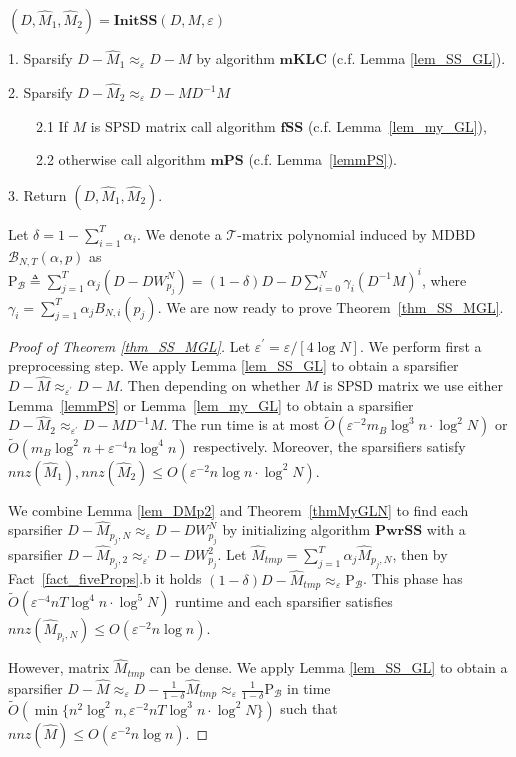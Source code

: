 \documentclass[11pt]{article}
\newcommand{\SPSD}{\mathrm{SPSD}}
\newcommand{\MDBD}{\mathrm{MDBD}}
\newcommand{\GL}{\mathcal{T}}
\newcommand{\BNTap}{\mathcal{B}_{N,T}(\alpha,p)}
\newcommand{\GLB}{\mathrm{P}_{\mathcal{B}}}
\newcommand{\mKLC}{\mathrm{\mathbf{mKLC}}}
\newcommand{\mPS}{\mathrm{\mathbf{mPS}}}
\newcommand{\fSS}{\mathrm{\mathbf{fSS}}}
\newcommand{\InitSS}{\mathrm{\mathbf{InitSS}}}
\newcommand{\PwrSS}{\mathrm{\mathbf{PwrSS}}}
\newcommand{\wO}{\widetilde{O}}
\newcommand{\hM}{\widehat{M}}
\newcommand{\Di}{D^{-1}}
\newcommand{\prm}{\prime}
\newcommand{\eps}{\epsilon}
\renewcommand{\leq}{\leqslant}
\renewcommand{\eps}{\varepsilon}
\numberwithin{thm}{section}
\begin{document}
\begin{algorithm}[H]
\caption{}
\label{alg_Preprocess}

$(D,\hM_{1},\hM_{2})=\InitSS(D,M,\eps)$

1. Sparsify $D-\hM_{1} \approx_{\eps}D-M$ by algorithm $\mKLC$ (c.f. Lemma \ref{lem_SS_GL}).

2. Sparsify $D-\hM_{2} \approx_{\eps}D-M\Di M$

$\qquad$2.1 If $M$ is $\SPSD$ matrix call algorithm $\fSS$ (c.f. Lemma~\ref{lem_my_GL}),

$\qquad$2.2 otherwise call algorithm $\mPS$ (c.f. Lemma~\ref{lemmPS}).

3. Return $(D,\hM_{1},\hM_{2})$.
\end{algorithm}

Let $\delta=1-\sum_{i=1}^{T}\alpha_i$. We denote a $\GL$-matrix polynomial induced by $\MDBD$ $\BNTap$ as
$\GLB \triangleq\sum_{j=1}^{T}\alpha_{j}(D-DW_{p_j}^{N}) =
(1-\delta)D-D\sum_{i=0}^{N}\gamma_{i}(\Di M)^{i}$,
where $\gamma_{i}=\sum_{j=1}^{T}\alpha_{j}B_{N,i}(p_j)$. We are now ready to prove Theorem~\ref{thm_SS_MGL}.

\begin{proof}[Proof of Theorem \ref{thm_SS_MGL}] Let $\eps^{\prm}=\eps/[4\log N]$.
We perform first a preprocessing step. We apply Lemma \ref{lem_SS_GL}
to obtain a sparsifier $D-\hM \approx_{\eps^{\prm}}D-M$.
Then depending on whether $M$ is $\SPSD$ matrix
we use either Lemma~\ref{lemmPS} or Lemma~\ref{lem_my_GL}
to obtain a sparsifier $D-\hM_{2}\approx_{\eps^{\prm}}D-M\Di M$.
The run time is at most $\wO(\eps^{-2}m_{B}\log^{3}n\cdot\log^{2}N)$ or $\wO(m_{B}\log^{2}n+\eps^{-4}n\log^{4}n)$ respectively. Moreover, the sparsifiers satisfy $nnz(\hM_{1}),nnz(\hM_{2})\leq O(\eps^{-2}n\log n\cdot\log^{2}N)$.

We combine Lemma \ref{lem_DMp2} and Theorem~\ref{thmMyGLN}
to find each sparsifier $D-\hM_{p_{j},N}\approx_{\eps}D-DW_{p_{j}}^{N}$
by initializing algorithm $\PwrSS$ with a sparsifier $D-\hM_{p_{j},2}\approx_{\eps^{\prm}}D-DW_{p_{j}}^{2}$.
Let $\hM_{tmp} = \sum_{j=1}^{T}\alpha_{j}\hM_{p_{j},N}$, then by Fact~\ref{fact_fiveProps}.b it holds $(1-\delta)D-\hM_{tmp} \approx_{\eps}\GLB$.
This phase has $\wO(\eps^{-4}nT\log^{4}n\cdot\log^{5}N)$ runtime and each sparsifier satisfies $nnz(\hM_{p_{i},N})\leq O(\eps^{-2}n\log n)$.

However, matrix $\hM_{tmp}$ can be dense. We
apply Lemma \ref{lem_SS_GL} to obtain a sparsifier $D-\hM \approx_{\eps}D-\frac{1}{1-\delta}\hM_{tmp} \approx_{\eps} \frac{1}{1-\delta}\GLB$
in time $\wO(\min\{ n^{2}\log^{2}n,\eps^{-2}nT\log^{3}n\cdot\log^{2}N\} )$
such that $nnz(\hM )\leq O(\eps^{-2}n\log n)$.
\end{proof}
\end{document}

